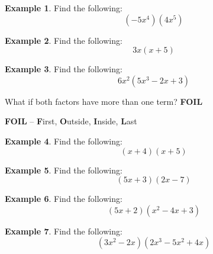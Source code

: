 \documentclass[addpoints,12pt]{exam}
\theoremstyle{definition}
\theoremstyle{break}
\theoremstyle{break}
\newtheorem{example}{Example}[subsection]
\begin{document}
\begin{example}
Find the following:
\[(-5x^4)(4x^5)\]
\vspace{.5in}
\end{example}

\begin{example}
Find the following:
\[3x(x+5)\]
\vspace{1in}
\end{example}

\begin{example}
Find the following:
\[6x^2(5x^3 - 2x + 3)\]
\end{example}

\newpage

\noindent What if both factors have more than one term? \textbf{FOIL}
\vspace{.15in}
\begin{mdframed}
\textbf{FOIL} -- \textbf{F}irst, \textbf{O}utside, \textbf{I}nside, \textbf{L}ast
\end{mdframed}
\vspace{.15in}

\begin{example}
Find the following:
\[(x+4)(x+5)\]
\vspace{.5in}
\end{example}

\begin{example}
Find the following:
\[(5x+3)(2x-7)\]
\vspace{.5in}
\end{example}

\begin{example}
Find the following:
\[(5x+2)(x^2-4x+3)\]
\vspace{1in}
\end{example}

\begin{example}
Find the following:
\[(3x^2-2x)(2x^3 - 5x^2 + 4x)\]
\end{example}
\end{document}
